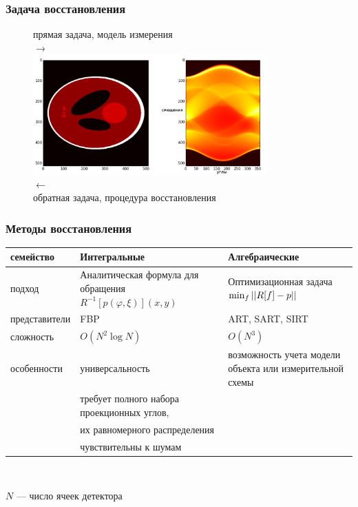 \documentclass[12pt]{beamer}
\begin{document}
\begin{frame}
\frametitle{Задача восстановления}
\begin{figure}
\centering
    прямая задача, модель измерения\\
    $\rightarrow$
    \\
    \includegraphics[width=0.8\textwidth]{sl_sinogram}
    \\
    $\leftarrow$ \\
    обратная задача, процедура восстановления
\end{figure}
\end{frame}

% 

\begingroup
\small
\begin{frame}
\frametitle{Методы восстановления}
\begin{tabular}{p{} | p{} | p{}}
\hspace{-1cm} семейство & Интегральные & Алгебраические \\ \hline
\hspace{-1cm} подход & Аналитическая формула для обращения $R^{-1}[p(\varphi, \xi)](x,y)$ & Оптимизационная задача $\min_{f} \left|\left| R[f] - p \right|\right|$\\ \hline
\hspace{-1cm} представители & FBP & ART, SART, SIRT \\ \hline
\hspace{-1cm} сложность & $O(N^2 \log N)$ & $O(N^3)$ \\ \hline
\hspace{-1cm} особенности & универсальность & возможность учета \hspace{1cm} модели объекта или измерительной схемы \\
                          & требует полного набора проекционных углов, & \\ 
                          & их равномерного распределения & \\
                          & чувствительны к шумам & \\
\end{tabular}
\\
\vspace{0.5cm}

$N$ --- число ячеек детектора
\end{frame}
\endgroup
\end{document}
